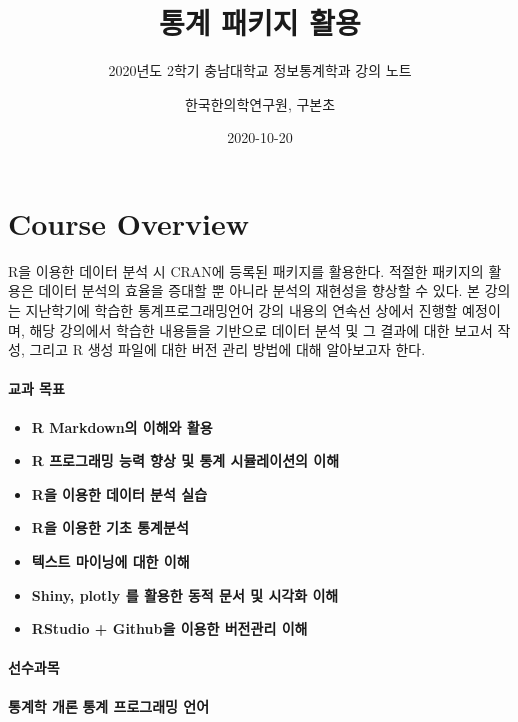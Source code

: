 \documentclass[
  11pt,
]{krantz}
\title{통계 패키지 활용}
\subtitle{2020년도 2학기 충남대학교 정보통계학과 강의 노트}
\author{한국한의학연구원, 구본초}
\date{2020-10-20}
\makeatletter
\providecommand{\tightlist}{%
  \setlength{\itemsep}{0pt}\setlength{\parskip}{0pt}}
\newenvironment{kframe}{%
\medskip{}
\setlength{\fboxsep}{.8em}
 \def\at@end@of@kframe{}%
 \ifinner\ifhmode%
  \def\at@end@of@kframe{\end{minipage}}%
  \begin{minipage}{\columnwidth}%
 \fi\fi%
 \def\FrameCommand##1{\hskip\@totalleftmargin \hskip-\fboxsep
 \colorbox{shadecolor}{##1}\hskip-\fboxsep
     \hskip-\linewidth \hskip-\@totalleftmargin \hskip\columnwidth}%
 \MakeFramed {\advance\hsize-\width
   \@totalleftmargin\z@ \linewidth\hsize
   \@setminipage}}%
 {\par\unskip\endMakeFramed%
 \at@end@of@kframe}
\renewenvironment{quote}{\begin{kframe}}{\end{kframe}}
\makeatother
\begin{document}
\maketitle

{
\hypersetup{linkcolor=}
\setcounter{tocdepth}{2}
\tableofcontents
}
\listoftables
\listoffigures
\hypertarget{overview}{%
\chapter*{Course Overview}\label{overview}}


R을 이용한 데이터 분석 시 CRAN에 등록된 패키지를 활용한다. 적절한 패키지의 활용은 데이터 분석의 효율을 증대할 뿐 아니라 분석의 재현성을 향상할 수 있다. 본 강의는 지난학기에 학습한 통계프로그래밍언어 강의 내용의 연속선 상에서 진행할 예정이며, 해당 강의에서 학습한 내용들을 기반으로 데이터 분석 및 그 결과에 대한 보고서 작성, 그리고 R 생성 파일에 대한 버전 관리 방법에 대해 알아보고자 한다.

\hypertarget{purpose-course}{%
\subsubsection*{교과 목표}\label{purpose-course}}


\begin{quote}
\begin{itemize}
\tightlist
\item
  \textbf{R Markdown의 이해와 활용}
\item
  \textbf{R 프로그래밍 능력 향상 및 통계 시뮬레이션의 이해}
\item
  \textbf{R을 이용한 데이터 분석 실습}
\item
  \textbf{R을 이용한 기초 통계분석}
\item
  \textbf{텍스트 마이닝에 대한 이해}
\item
  \textbf{Shiny, plotly 를 활용한 동적 문서 및 시각화 이해}
\item
  \textbf{RStudio + Github을 이용한 버전관리 이해}
\end{itemize}
\end{quote}

\hypertarget{pre-course}{%
\subsubsection*{선수과목}\label{pre-course}}


\begin{quote}
\textbf{통계학 개론}
\textbf{통계 프로그래밍 언어}
\end{quote}
\end{document}
